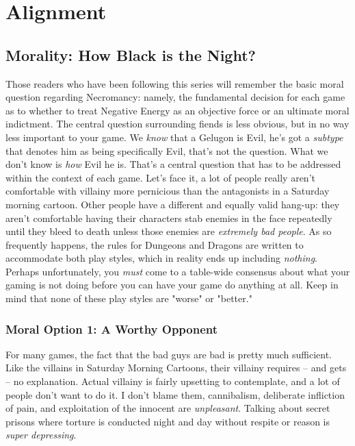 \section{Alignment}

\subsection{Morality: How Black is the Night?}

Those readers who have been following this series will remember the basic moral question regarding Necromancy: namely, the fundamental decision for each game as to whether to treat Negative Energy as an objective force or an ultimate moral indictment. The central question surrounding fiends is less obvious, but in no way less important to your game. We \textit{know} that a Gelugon is Evil, he's got a \textit{subtype} that denotes him as being specifically Evil, that's not the question. What we don't know is \textit{how} Evil he is. That's a central question that has to be addressed within the context of each game. Let's face it, a lot of people really aren't comfortable with villainy more pernicious than the antagonists in a Saturday morning cartoon. Other people have a different and equally valid hang-up: they aren't comfortable having their characters stab enemies in the face repeatedly until they bleed to death unless those enemies are \textit{extremely bad people}. As so frequently happens, the rules for Dungeons and Dragons are written to accommodate both play styles, which in reality ends up including \textit{nothing}. Perhaps unfortunately, you \textit{must} come to a table-wide consensus about what your gaming is not doing before you can have your game do anything at all.  Keep in mind that none of these play styles are "worse" or "better."\\

\subsubsection{Moral Option 1: A Worthy Opponent}
\vspace*{-8pt}

For many games, the fact that the bad guys are bad is pretty much sufficient. Like the villains in Saturday Morning Cartoons, their villainy requires -- and gets -- no explanation. Actual villainy is fairly upsetting to contemplate, and a lot of people don't want to do it. I don't blame them, cannibalism, deliberate infliction of pain, and exploitation of the innocent are \textit{unpleasant}. Talking about secret prisons where torture is conducted night and day without respite or reason is \textit{super depressing}.

